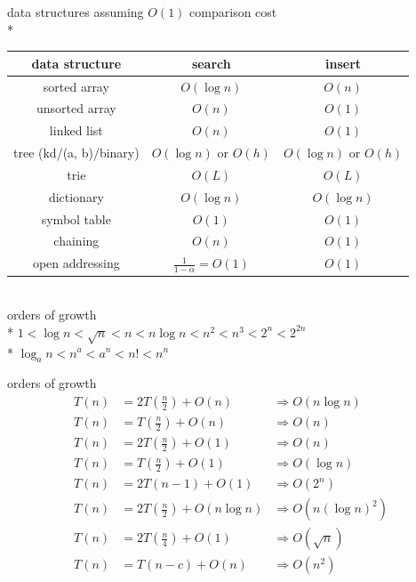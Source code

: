 \documentclass[10pt, landscape]{article}
\newenvironment{tightcenter}{%
  \setlength\topsep{0pt}
  \setlength\parskip{0pt}
  \begin{center}
}{%
  \end{center}
}
\begin{document}
\begin{multicols}{3}
\begin{tightcenter}
        data structures assuming $O(1)$ comparison cost
        \\* \begin{tabular}{| c | c | c |}\hline
            \textbf{data structure} & \textbf{search} & \textbf{insert}\\\hline
            sorted array & $O(\log n)$ & $O(n)$ \\\hline
            unsorted array & $O(n)$ & $O(1)$ \\\hline
            linked list & $O(n)$ & $O(1)$ \\\hline
            tree (kd/(a, b)/binary) & $O(\log n)$ or $O(h)$ & $O(\log n)$ or $O(h)$ \\\hline
            trie & $O(L)$ & $O(L)$ \\\hline
            dictionary & $O(\log n)$ & $O(\log n)$ \\\hline
            symbol table & $O(1)$ & $O(1)$ \\\hline
            chaining & $O(n)$ & $O(1)$ \\\hline
            open addressing & $\frac{1}{1-\alpha} = O(1)$ & $O(1)$ \\\hline
        \end{tabular}

        \ 
        \\ orders of growth
        \\* $1 < \log n < \sqrt{n} < n < n \log n < n^2 < n^3 < 2^n < 2^{2n}$
        \\* $\log_a n < n^a < a^n < n! < n^n$

        orders of growth
        \begin{align*}
            T(n) &= 2T(\frac{n}{2}) + O(n) &\Rightarrow O(n \log n)
            \\ T(n) &= T(\frac{n}{2}) + O(n) &\Rightarrow O(n)
            \\ T(n) &= 2T(\frac{n}{2}) + O(1) &\Rightarrow O(n)
            \\ T(n) &= T(\frac{n}{2}) + O(1) &\Rightarrow O(\log n)
            \\ T(n) &= 2T(n - 1) + O(1) &\Rightarrow O(2^n)
            \\ T(n) &= 2T(\frac{n}{2}) + O(n \log n) &\Rightarrow O(n(\log n)^2)
            \\ T(n) &= 2T(\frac{n}{4}) + O(1) &\Rightarrow O(\sqrt{n})
            \\ T(n) &= T(n - c) + O(n) &\Rightarrow O(n^2)
        \end{align*}
    \end{tightcenter}
\end{multicols}
\end{document}

